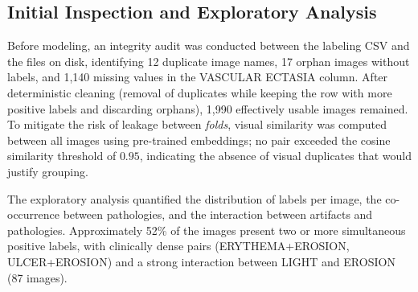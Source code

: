 \documentclass[12pt]{article}
\begin{document}



\subsection{Initial Inspection and Exploratory Analysis}

Before modeling, an integrity audit was conducted between the labeling CSV and the files on disk, identifying 12 duplicate image names, 17 orphan images without labels, and 1,140 missing values in the VASCULAR ECTASIA column. After deterministic cleaning (removal of duplicates while keeping the row with more positive labels and discarding orphans), 1,990 effectively usable images remained. To mitigate the risk of leakage between \textit{folds}, visual similarity was computed between all images using pre-trained embeddings; no pair exceeded the cosine similarity threshold of $0.95$, indicating the absence of visual duplicates that would justify grouping.

The exploratory analysis quantified the distribution of labels per image, the co-occurrence between pathologies, and the interaction between artifacts and pathologies. Approximately 52\% of the images present two or more simultaneous positive labels, with clinically dense pairs (ERYTHEMA+EROSION, ULCER+EROSION) and a strong interaction between LIGHT and EROSION (87 images).
\end{document}
